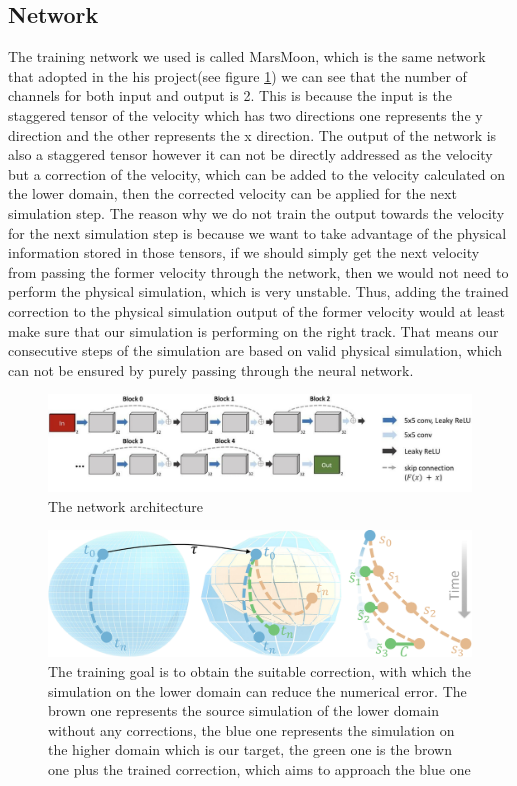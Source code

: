 \documentclass[a4paper,12pt,twoside]{report}
\begin{document}
\subsection{Network}
The training network we used is called MarsMoon, which is the same network that \citeauthor{um2020sol} adopted in the his project(see figure \ref{marsmoon}) we can see that the number of channels for both input and output is 2. This is because the input is the staggered tensor of the velocity which has two directions one represents the y direction and the other represents the x direction. The output of the network is also a staggered tensor however it can not be directly addressed as the velocity but a correction of the velocity, which can be added to the velocity calculated on the lower domain, then the corrected velocity can be applied for the next simulation step. The reason why we do not train the output towards the velocity for the next simulation step is because we want to take advantage of the physical information stored in those tensors, if we should simply get the next velocity from passing the former velocity through the network, then we would not need to perform the physical simulation, which is very unstable. Thus, adding the trained correction to the physical simulation output of the former velocity would at least make sure that our simulation is performing on the right track. That means our consecutive steps of the simulation are based on valid physical simulation, which can not be ensured by purely passing through the neural network.
\begin{figure}
\centering
\includegraphics[width=1.0\textwidth]{marsmoon.jpg}
\caption{The network architecture\cite{um2020sol}}
\label{marsmoon}
\end{figure}

\begin{figure}
\centering
\includegraphics[width=1.0\textwidth]{Manifolds.pdf}
\caption{The training goal is to obtain the suitable correction, with which the simulation on the lower domain can reduce the numerical error. The brown one represents the source simulation of the lower domain without any corrections, the blue one represents the simulation on the higher domain which is our target, the green one is the brown one plus the trained correction, which aims to approach the blue one\cite{um2020sol}}
\end{figure}
\end{document}
